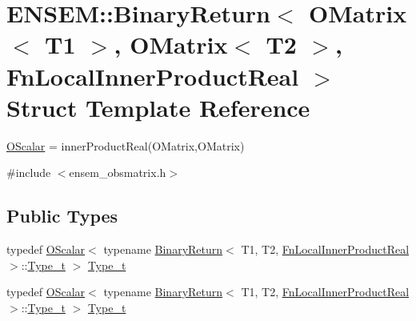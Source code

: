 \hypertarget{structENSEM_1_1BinaryReturn_3_01OMatrix_3_01T1_01_4_00_01OMatrix_3_01T2_01_4_00_01FnLocalInnerProductReal_01_4}{}\section{E\+N\+S\+EM\+:\+:Binary\+Return$<$ O\+Matrix$<$ T1 $>$, O\+Matrix$<$ T2 $>$, Fn\+Local\+Inner\+Product\+Real $>$ Struct Template Reference}
\label{structENSEM_1_1BinaryReturn_3_01OMatrix_3_01T1_01_4_00_01OMatrix_3_01T2_01_4_00_01FnLocalInnerProductReal_01_4}


\mbox{\hyperlink{classENSEM_1_1OScalar}{O\+Scalar}} = inner\+Product\+Real(\+O\+Matrix,\+O\+Matrix)  




{\ttfamily \#include $<$ensem\+\_\+obsmatrix.\+h$>$}

\subsection*{Public Types}
\begin{DoxyCompactItemize}
\item 
typedef \mbox{\hyperlink{classENSEM_1_1OScalar}{O\+Scalar}}$<$ typename \mbox{\hyperlink{structENSEM_1_1BinaryReturn}{Binary\+Return}}$<$ T1, T2, \mbox{\hyperlink{structENSEM_1_1FnLocalInnerProductReal}{Fn\+Local\+Inner\+Product\+Real}} $>$\+::\mbox{\hyperlink{structENSEM_1_1BinaryReturn_3_01OMatrix_3_01T1_01_4_00_01OMatrix_3_01T2_01_4_00_01FnLocalInnerProductReal_01_4_a64139d0b3cc92c79f958c772a7c70bad}{Type\+\_\+t}} $>$ \mbox{\hyperlink{structENSEM_1_1BinaryReturn_3_01OMatrix_3_01T1_01_4_00_01OMatrix_3_01T2_01_4_00_01FnLocalInnerProductReal_01_4_a64139d0b3cc92c79f958c772a7c70bad}{Type\+\_\+t}}
\item 
typedef \mbox{\hyperlink{classENSEM_1_1OScalar}{O\+Scalar}}$<$ typename \mbox{\hyperlink{structENSEM_1_1BinaryReturn}{Binary\+Return}}$<$ T1, T2, \mbox{\hyperlink{structENSEM_1_1FnLocalInnerProductReal}{Fn\+Local\+Inner\+Product\+Real}} $>$\+::\mbox{\hyperlink{structENSEM_1_1BinaryReturn_3_01OMatrix_3_01T1_01_4_00_01OMatrix_3_01T2_01_4_00_01FnLocalInnerProductReal_01_4_a64139d0b3cc92c79f958c772a7c70bad}{Type\+\_\+t}} $>$ \mbox{\hyperlink{structENSEM_1_1BinaryReturn_3_01OMatrix_3_01T1_01_4_00_01OMatrix_3_01T2_01_4_00_01FnLocalInnerProductReal_01_4_a64139d0b3cc92c79f958c772a7c70bad}{Type\+\_\+t}}
\end{DoxyCompactItemize}


